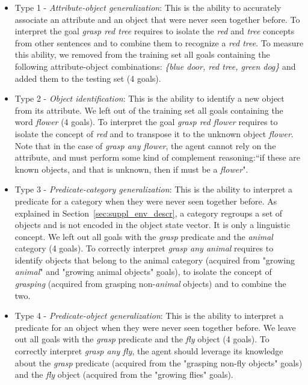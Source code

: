 \begin{itemize}
    \item Type 1 - \textit{Attribute-object generalization}: This is the ability to accurately associate an attribute and an object that were never seen together before. To interpret the goal \textit{grasp red tree} requires to isolate the \textit{red} and \textit{tree} concepts from other sentences and to combine them to recognize a \textit{red tree}. To measure this ability, we removed from the training set all goals containing the following attribute-object combinations: \textit{\{blue door, red tree, green dog\}} and added them to the testing set (4 goals). 
    
    \item Type 2 - \textit{Object identification}: This is the ability to identify a new object from its attribute. We left out of the training set all goals containing the word \textit{flower} (4 goals). To interpret the goal \textit{grasp red flower} requires to isolate the concept of \textit{red} and to transpose it to the unknown object \textit{flower}. Note that in the case of \textit{grasp any flower}, the agent cannot rely on the attribute, and must perform some kind of complement reasoning:``if these are known objects, and that is unknown, then if must be a \textit{flower}".
    
    \item Type 3 - \textit{Predicate-category generalization}: 
    This is the ability to interpret a predicate for a category when they were never seen together before. As explained in Section~\ref{sec:suppl_env_descr}, a category regroups a set of objects and is not encoded in the object state vector. It is only a linguistic concept. We left out all goals with the \textit{grasp} predicate and the \textit{animal} category (4 goals). To correctly interpret \textit{grasp any animal} requires to identify objects that belong to the animal category (acquired from "growing \textit{animal}" and "growing animal objects" goals), to isolate the concept of \textit{grasping} (acquired from grasping non-\textit{animal} objects) and to combine the two.
    
    \item Type 4 - \textit{Predicate-object generalization}:  This is the ability to interpret a predicate for an object when they were never seen together before. We leave out all goals with the \textit{grasp} predicate and the \textit{fly} object (4 goals). To correctly interpret \textit{grasp any fly}, the agent should  leverage its knowledge about the \textit{grasp} predicate (acquired from the "grasping non-fly objects" goals) and the \textit{fly} object (acquired from the "growing flies" goals).
    

\end{itemize}
